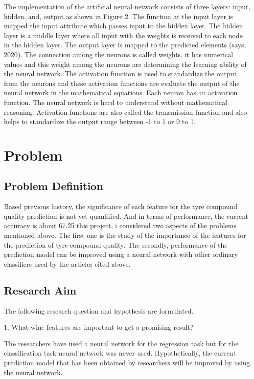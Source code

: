 \documentclass{article}
\begin{document}
The implementation of the artificial neural network consists of three
layers: input, hidden, and, output as shown in Figure 2. The function
at the input layer is mapped the input attribute which passes input to
the hidden layer. The hidden layer is a middle layer where all input
with the weights is received to each node in the hidden layer. The
output layer is mapped to the predicted elements (says, 2020).
The connection among the neurons is called weights, it has numerical
values and this weight among the neurons are determining the learning
ability of the neural network. The activation function is used to
standardize the output from the neurons and these activation functions
are evaluate the output of the neural network in the mathematical
equations. Each neuron has an activation function. The neural network
is hard to understand without mathematical reasoning. Activation
functions are also called the transmission function and also helps to
standardize the output range between -1 to 1 or 0 to 1.


\section{Problem}

\subsection{Problem Definition}

Based previous history, the significance of each
feature for the tyre compound quality prediction is not yet quantified. And in
terms of performance, the current accuracy is about 67.25%
this project, i considered two aspects of the problems mentioned
above. The first one is the study of the importance of the features for
the prediction of tyre compound quality. The secondly, performance of the
prediction model can be improved using a neural network with other
ordinary classifiers used by the articles cited above.


\subsection{Research Aim}

The following research question and hypothesis are formulated.

1. What wine features are important to get a promising result?

The researchers have used a neural network for the regression task but
for the classification task neural network was never used.
Hypothetically, the current prediction model that has been obtained by
researchers will be improved by using the neural network.
\end{document}
